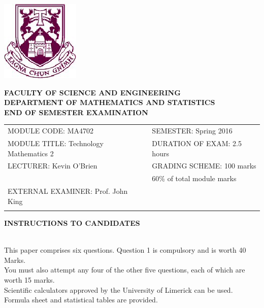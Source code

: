 \documentclass[a4paper,12pt]{article}
\begin{document}
 	
 	\begin{center}
 		\includegraphics[scale=0.60]{shieldtransparent2}
 	\end{center}
 	
 	\begin{center}
 \vspace{1cm}
 \large \bf {FACULTY OF SCIENCE AND ENGINEERING} \\[0.5cm]
 \normalsize DEPARTMENT OF MATHEMATICS AND STATISTICS \\[1.25cm]
 \large \bf {END OF SEMESTER EXAMINATION} \\[1.5cm]
 	\end{center}
 	
 	\begin{tabular}{ll}
 		MODULE CODE: MA4702 & SEMESTER: Spring 2016\\[1cm]
 		MODULE TITLE: Technology Mathematics 2 & DURATION OF EXAM: 2.5 hours \\[1cm]
 		LECTURER: Kevin O'Brien & GRADING SCHEME: 100 marks\\
 		& \phantom{GRADING SCHEME:} \footnotesize {60\% of total module marks}   \\[0.8cm]
 		EXTERNAL EXAMINER: Prof. John King & \\[1cm]
 		\\[1cm]
 	\end{tabular}
 	\begin{center}
 		{\bf INSTRUCTIONS TO CANDIDATES}
 	\end{center}
 	
 	{\noindent \\ This paper comprises six questions. Question 1 is compulsory and is worth 40 Marks.\\  You must also attempt any four of the other five questions, each of which are worth 15 marks.
 		\\ Scientific calculators approved by the University of Limerick can be used. 
 		\\ Formula sheet and statistical tables are provided.
 	}
 	\normalsize
 	\newpage
 	\large
\end{document}
